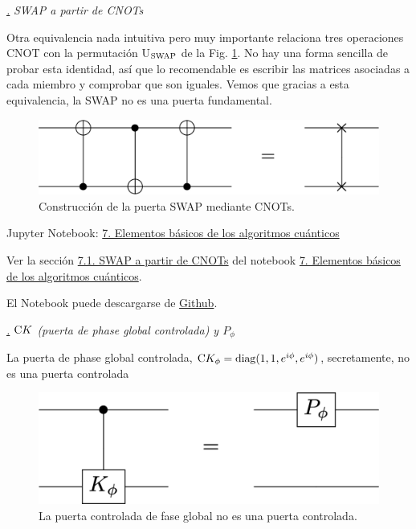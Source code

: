 \documentclass[a4paper,11pt]{book} %
\numberwithin{equation}{chapter}
\newcommand{\cg}[1]{{\rm C}#1}
\def\subsubiContadorIt{\par\addtocounter{subsubsection}{1}\underline{\it\thesubsubsection.}\hskip0.5cm \setcounter{subsubsubsectionIt}{0}}
\newcommand{\SubsubiIt}[1]{
		\subsubiContadorIt \textit{#1}
	}
\newcounter{subsubsubsectionIt}[subsubsection]
\begin{document}
			\SubsubiIt{SWAP a partir de CNOTs} 

Otra  equivalencia nada intuitiva pero muy importante relaciona tres operaciones CNOT con la permutación U$_{\rm SWAP}$ de la Fig. \ref{Fig_elementos_Equiv_CNOTs}. No hay una forma sencilla de probar esta identidad, así que lo recomendable es escribir las matrices asociadas a cada miembro y comprobar que son iguales. Vemos que gracias a esta equivalencia, la SWAP no es una puerta fundamental.
	\begin{figure}[H]
	\centering 
	\includegraphics[width=0.45\linewidth]{Figuras/Fig_elementos_Equiv_CNOTs.png}
	\caption{Construcción de la puerta SWAP mediante CNOTs.}
	\label{Fig_elementos_Equiv_CNOTs}
	\end{figure}

	\begin{mybox_orange}{Jupyter Notebook: \href{https://www.scbi.uma.es/web/wp-content/uploads/Jupyterbook/CICC_UMA/Notebooks/html/docs/Part_01/Chapter_07-Elementos_Basicos_myst.html}{7. Elementos básicos de los algoritmos cuánticos}}

	Ver la sección \href{https://www.scbi.uma.es/web/wp-content/uploads/Jupyterbook/CICC_UMA/Notebooks/html/docs/Part_01/Chapter_07-Elementos_Basicos_myst.html#swap-a-partir-de-cnots}{7.1. SWAP a partir de CNOTs} del notebook \href{https://www.scbi.uma.es/web/wp-content/uploads/Jupyterbook/CICC_UMA/Notebooks/html/docs/Part_01/Chapter_07-Elementos_Basicos_myst.html}{7. Elementos básicos de los algoritmos cuánticos}.
	
	El Notebook puede descargarse de \href{https://github.com/davidcb98/CICC_UMA/blob/master/Notebooks/Part_01/Chapter_07-Elementos_Basicos.ipynb}{Github}.
	\end{mybox_orange}



			\SubsubiIt{$\cg{K}$ (puerta de phase global controlada) y $P_\phi$}

La puerta de phase global controlada, $\cg{K_\phi} = {\rm diag} (1,1,e^{i\phi}, e^{i\phi})$, secretamente, no es una puerta controlada
	\begin{figure}[H]
	\centering 
	\includegraphics[width=0.35\linewidth]{Figuras/Fig_elementos_Equiv_Kphase.png}
	\caption{La puerta controlada de fase global no es una puerta controlada.}
	\label{Fig_elementos_Equiv_Kphase}
	\end{figure}
\end{document}
